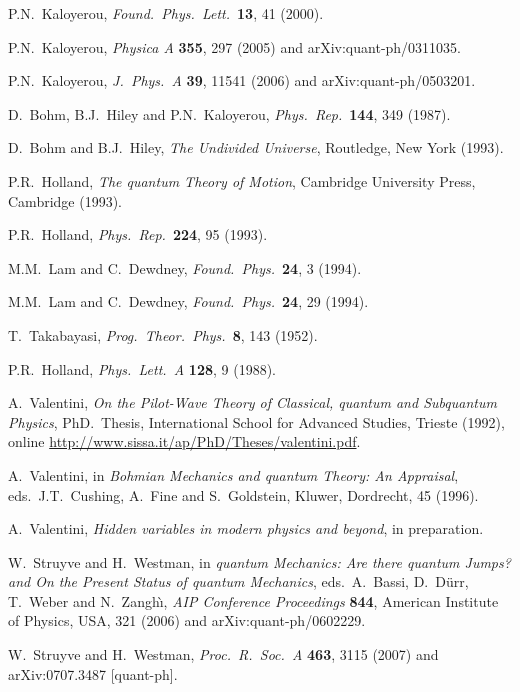 \documentclass[12pt]{article}
\begin{document}
\begin{thebibliography}{100}
{P.N.\ Kaloyerou, {\em Found.\ Phys.\ Lett.}\ {\bf 13}, 41 (2000).}

{P.N.\ Kaloyerou, {\em Physica A} {\bf 355}, 297 (2005) and
  arXiv:quant-ph/0311035.}

{P.N.\ Kaloyerou, {\em J.\ Phys.\ A} {\bf 39}, 11541 (2006) and
  arXiv:quant-ph/0503201.}

{D.\ Bohm, B.J.\ Hiley and P.N.\ Kaloyerou, {\em Phys.\ Rep.}\ {\bf 144}, 349
  (1987).}

{D.\ Bohm and B.J.\ Hiley, {\em The Undivided Universe}, Routledge, New York
  (1993).}

{P.R.\ Holland, {\em The quantum Theory of Motion}, Cambridge University Press,
  Cambridge (1993).}

{P.R.\ Holland, {\em Phys.\ Rep.}\ {\bf 224}, 95 (1993).}

{M.M.\ Lam and C.\ Dewdney, {\em Found.\ Phys.}\ {\bf 24}, 3 (1994).}

{M.M.\ Lam and C.\ Dewdney, {\em Found.\ Phys.}\ {\bf 24}, 29 (1994).}

{T.\ Takabayasi, {\em Prog.\ Theor.\ Phys.}\ {\bf 8}, 143 (1952).}

{P.R.\ Holland, {\em Phys.\ Lett.\ A} {\bf 128}, 9 (1988).}

{A.\ Valentini, {\em On the Pilot-Wave Theory of Classical, quantum and
  Subquantum Physics}, PhD.\ Thesis, International School for Advanced Studies,
  Trieste (1992), online
  \url{http://www.sissa.it/ap/PhD/Theses/valentini.pdf}.}

{A.\ Valentini, in {\em Bohmian Mechanics and quantum Theory: An Appraisal},
  eds.\ J.T.\ Cushing, A.\ Fine and S.\ Goldstein, Kluwer, Dordrecht, 45
  (1996).}

{A.\ Valentini, {\em Hidden variables in modern physics and beyond}, in
  preparation.}

{W.\ Struyve and H.\ Westman, in {\em quantum Mechanics: Are there quantum
  Jumps? and On the Present Status of quantum Mechanics}, eds.\ A.\ Bassi, D.\
  D\"urr, T.\ Weber and N.\ Zangh\`\i, {\em AIP Conference Proceedings} {\bf
  844}, American Institute of Physics, USA, 321 (2006) and arXiv:quant-ph/0602229.}

{W.\ Struyve and H.\ Westman, {\em Proc.\ R.\ Soc.\ A} {\bf 463}, 3115 (2007)
  and arXiv:0707.3487 [quant-ph].}


\end{thebibliography}
\end{document}
